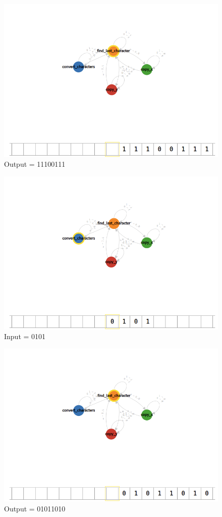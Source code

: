 \documentclass[12pt]{article}
\begin{document}
\begin{figure}[H]
    \caption{Output = 11100111}
    \centering
    \includegraphics[width=12cm]{Q2/11100111.png}
\end{figure}
\begin{figure}[H]
    \caption{Input = 0101}
    \centering
    \includegraphics[width=12cm]{Q2/0101.png}
\end{figure}
\begin{figure}[H]
    \caption{Output = 01011010}
    \centering
    \includegraphics[width=12cm]{Q2/01011010.png}
\end{figure}
\end{document}
